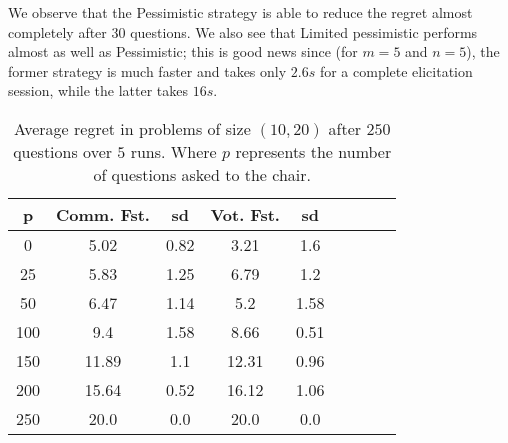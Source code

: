 \documentclass[sigconf, anonymous]{aamas}
\begin{document}
We observe that the Pessimistic strategy is able to reduce the regret almost completely after $30$ questions. We also see that Limited pessimistic performs almost as well as Pessimistic; this is good news since (for $m=5$ and $n=5$), the former strategy is much faster and takes only $2.6s$ for a complete elicitation session, while the latter takes $16s$.

\begin{table}
	\begin{center}
		\begin{tabular}{S[table-figures-integer=3, table-number-alignment = right, table-figures-decimal=0]S[table-number-alignment = right]@{ ± }S[table-number-alignment = left]S[table-number-alignment = right]@{ ± }S[table-number-alignment = left]S[table-number-alignment = right]@{ ± }S[table-number-alignment = left]S[table-number-alignment = right]@{ ± }S[table-number-alignment = left]}
			\toprule
			{p} & {Comm. Fst.} & {sd} & {Vot. Fst.} & {sd} \\
			 & 5.02 & 0.82 & 3.21 & 1.6 \\
			25 & 5.83 & 1.25 & 6.79 & 1.2 \\
			50 & 6.47 & 1.14 & 5.2 & 1.58 \\
			100 & 9.4 & 1.58 & 8.66 & 0.51 \\
			150 & 11.89 & 1.1 & 12.31 & 0.96 \\
			200 & 15.64  & 0.52 & 16.12 & 1.06 \\
			250 & 20.0 & 0.0 & 20.0 & 0.0 \\
			\bottomrule
		\end{tabular}
	\end{center}
	\caption{Average regret in problems of size $(10, 20)$ after $250$ questions over $5$ runs. Where $p$ represents the number of questions asked to the chair.}
	\label{fig:p}
\end{table}
\end{document}
